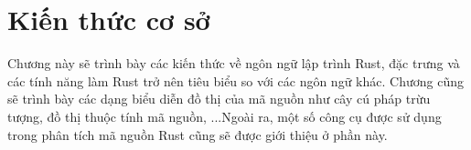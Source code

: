\chapter{Kiến thức cơ sở}
\label{chap:background}

Chương này sẽ trình bày các kiến thức về ngôn ngữ lập trình Rust, đặc trưng và các tính năng làm Rust trở nên tiêu biểu so với các ngôn ngữ khác. Chương cũng sẽ trình bày các dạng biểu diễn đồ thị của mã nguồn như cây cú pháp trừu tượng, đồ thị thuộc tính mã nguồn, ...Ngoài ra, một số công cụ được sử dụng trong phân tích mã nguồn Rust cũng sẽ được giới thiệu ở phần này.






